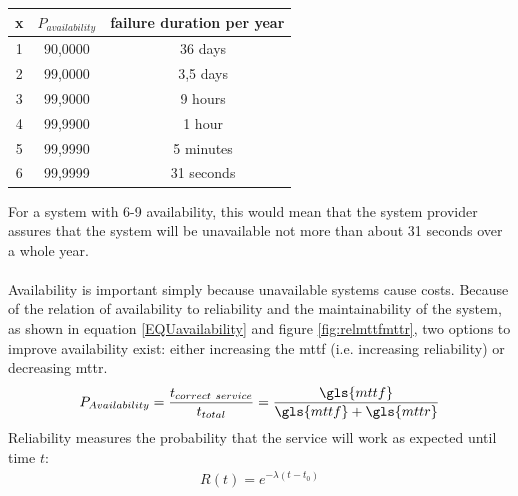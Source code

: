 \begin{center}
\begin{tabular}{ c | c c  }
 \label{table:x-9}
  x & $P_{availability}$ & failure duration per year \\ \hline
  1 & 90,0000    & ~ 36 days \\
  2 & 99,0000    & ~ 3,5 days  \\
  3 & 99,9000    & ~ 9 hours \\
  4 & 99,9900    & ~ 1 hour \\
  5 & 99,9990    & ~ 5 minutes \\
  6 & 99,9999    & ~ 31 seconds \\ 
  
\end{tabular}
\end{center}
For a system with 6-9 availability, this would mean that the system provider assures that the system will be unavailable not more than about 31 seconds over a
whole year.
\\
\\
Availability is important simply because unavailable systems cause costs. Because of the relation of availability to reliability and the maintainability
of the system, as shown in equation \ref{EQUavailability} and figure \ref{fig:relmttfmttr}, two options to improve availability exist: either increasing
the \gls{mttf} (i.e. increasing reliability) or decreasing \gls{mttr}.
\begin{align}\label{EQUavailability}
 P_{Availability} = \frac{t_{correct\ service}}{t_{total}} =  \frac{{\gls{mttf}}}{\gls{mttf}+\gls{mttr}}
\end{align}
Reliability measures the probability that the service will work as expected until time $t$:
\begin{align}\label{expFailLaw}
 R(t) = e^{-\lambda(t-t_0)}
\end{align}
